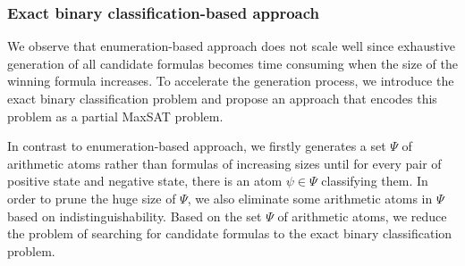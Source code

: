 \documentclass[review]{elsarticle}
\newcommand{\positiveSet}{\mathcal{P}}
\newcommand{\negativeSet}{\mathcal{N}}
\newcommand\ie{{\it i.e.}}
\newcommand{\featureSet}{\Psi}
\begin{document}


	\subsubsection{Exact binary classification-based approach}
	We observe that enumeration-based approach does not scale well since exhaustive generation of all candidate formulas becomes time consuming when the size of the winning formula increases.
	To accelerate the generation process, we introduce the exact binary classification problem and propose an approach that encodes this problem as a partial MaxSAT problem.

	In contrast to enumeration-based approach, we firstly generates a set $\featureSet$ of arithmetic atoms rather than formulas of increasing sizes until for every pair of positive state and negative state, there is an atom $\psi \in \featureSet$ classifying them.
	In order to prune the huge size of $\featureSet$, we also eliminate some arithmetic atoms in $\featureSet$ based on indistinguishability. 
	Based on the set $\featureSet$ of arithmetic atoms, we reduce the problem of searching for candidate formulas to the exact binary classification problem.
	
\end{document}
